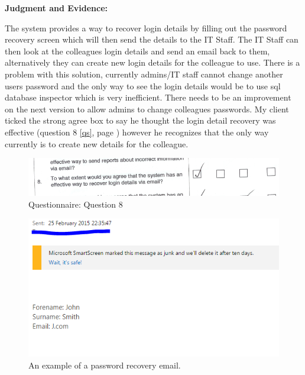 \textbf{Judgment and Evidence:}

The system provides a way to recover login details by filling out the password recovery screen which will then send the details to the IT Staff. The IT Staff can then look at the colleagues login details and send an email back to them, alternatively they can create new login details for the colleague to use. There is a problem with this solution, currently admins/IT staff cannot change another users password and the only way to see the login details would be to use sql database inspector which is very inefficient. There needs to be an improvement on the next version to allow admins to change colleagues passwords. My client ticked the strong agree box to say he thought the login detail recovery was effective (question 8 \ref{qs}, page \pageref{qs}) however he recognizes that the only way currently is to create new details for the colleague.

\begin{figure}[H]
    \includegraphics[width=\textwidth]{./Evaluation/EvaluationQuestionnaire/8.png}
    \caption{Questionnaire: Question 8} 
\end{figure}

\begin{figure}[H]
    \includegraphics[width=\textwidth]{./Testing/Images/ForgotPasswordValidationEmail.png}
    \caption{An example of a password recovery email.} 
\end{figure}

